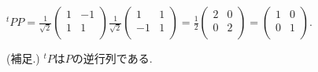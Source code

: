 \documentclass[dvipdfmx,a4paper,11pt]{article}
\theoremstyle{definition}
\begin{document}
\begin{itemize}
 ${}^t PP = 
 \frac{1}{\sqrt{2}} 
\begin{pmatrix}
1& -1\\
1 & 1\\
 \end{pmatrix}
   \frac{1}{\sqrt{2}} 
\begin{pmatrix} %
1& 1\\
-1 & 1\\
 \end{pmatrix}
 =
  \frac{1}{2} 
  \begin{pmatrix}
2& 0\\
0& 2\\
 \end{pmatrix}
 =
 \begin{pmatrix}
1& 0\\
0& 1\\
 \end{pmatrix}
 $.
 
(補足.) ${}^t P$は$P$の逆行列である.
 

\end{itemize}
\end{document}
